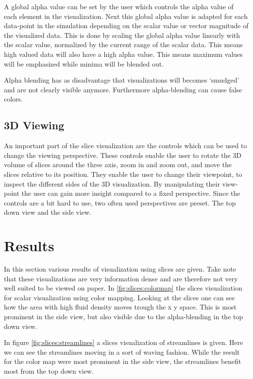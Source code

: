 A global alpha value can be set by the user which controls the alpha value of each element in the visualization. Next this global alpha value is adapted for each data-point in the simulation depending on the scalar value or vector magnitude of the visualized data. This is done by scaling the global alpha value linearly with the scalar value, normalized by the current range of the scalar data. This means high valued data will also have a high alpha value. This means maximum values will be emphasized while minima will be blended out.

Alpha blending has as disadvantage that visualizations will becomes `smudged' and are not clearly visible anymore. Furthermore alpha-blending can cause false colors.

\subsection{3D Viewing} %
\label{sub:3d_controls}
An important part of the slice visualization are the controls which can be used to change the viewing perspective. These controls enable the user to rotate the 3D volume of slices around the three axis, zoom in and zoom out, and move the slices relative to its position. They enable the user to change their viewpoint, to inspect the different sides of the 3D visualization. By manipulating their view-point the user can gain more insight compared to a fixed perspective. Since the controls are a bit hard to use, two often used perspectives are preset. The top down view and the side view. 

\section{Results} %
\label{sec:results}
In this section various results of visualization using slices are given. Take note that these visualizations are very information dense and are therefore not very well suited to be viewed on paper. In \cref{fig:slices:colormap} the slices visualization for scalar visualization using color mapping. Looking at the slices one can see how the area with high fluid density moves trough the x y space. This is most prominent in the side view, but also visible due to the alpha-blending in the top down view.

In figure \ref{fig:slices:streamlines} a slices visualization of streamlines is given. Here we can see the streamlines moving in a sort of waving fashion. While the result for the color map were most prominent in the side view, the streamlines benefit most from the top down view.

